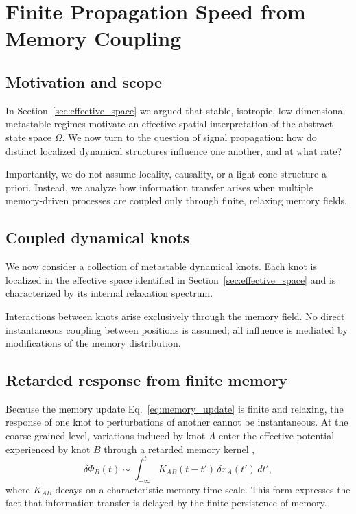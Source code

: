 \documentclass[reprint,amsmath,amssymb,aps,prl,nofootinbib,floatfix]{revtex4-2}
\begin{document}
\section{Finite Propagation Speed from Memory Coupling}\label{sec:finite_speed}

\subsection{Motivation and scope}
In Section~\ref{sec:effective_space} we argued that stable, isotropic, low-dimensional metastable regimes motivate an effective spatial interpretation of the abstract state space $\Omega$.
We now turn to the question of signal propagation: how do distinct localized dynamical structures influence one another, and at what rate?

Importantly, we do not assume locality, causality, or a light-cone structure a priori.
Instead, we analyze how information transfer arises when multiple memory-driven processes are coupled only through finite, relaxing memory fields.

\subsection{Coupled dynamical knots}

We now consider a collection of metastable dynamical knots.
Each knot is localized in the effective space identified in Section~\ref{sec:effective_space} and is characterized by its internal relaxation spectrum.

Interactions between knots arise exclusively through the memory field.
No direct instantaneous coupling between positions is assumed; all influence is mediated by modifications of the memory distribution.

\subsection{Retarded response from finite memory}
Because the memory update Eq.~\eqref{eq:memory_update} is finite and relaxing, the response of one knot to perturbations of another cannot be instantaneous.
At the coarse-grained level, variations induced by knot $A$ enter the effective potential experienced by knot $B$ through a retarded memory kernel \cite{Kubo1957},
\begin{equation}
\delta\Phi_B(t)
\sim \int_{-\infty}^{t} K_{AB}(t-t')\,\delta x_A(t')\,dt',
\label{eq:retarded_kernel}
\end{equation}
where $K_{AB}$ decays on a characteristic memory time scale.
This form expresses the fact that information transfer is delayed by the finite persistence of memory.
\end{document}
